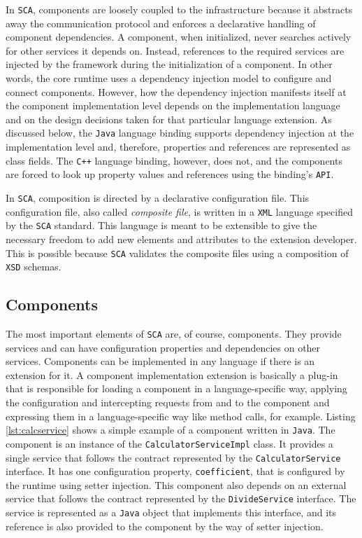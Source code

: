 In \texttt{SCA}, components are loosely coupled to the infrastructure because it abstracts away the communication protocol
and enforces a declarative handling of component dependencies. A component, when initialized, never searches
actively for other services it depends on. Instead, references to the required services are injected by the framework
during the initialization of a component. In other words, the core runtime uses a dependency injection model to
configure and connect components. However, how the dependency injection manifests itself at the component implementation
level depends on the implementation language and on the design decisions taken for that particular language extension.
As discussed below, the \texttt{Java} language binding supports dependency injection at the implementation level and, therefore,
properties and references are represented as class fields. The \texttt{C++} language binding, however, does not, and the components
are forced to look up property values and references using the binding's \texttt{API}.

In \texttt{SCA}, composition is directed by a declarative configuration file. This configuration file, also called \emph{composite file},
is written in a \texttt{XML} language specified by the \texttt{SCA} standard. This language is meant to be extensible to give the necessary
freedom to add new elements and attributes to the extension developer. This is possible because \texttt{SCA} validates the
composite files using a composition of \texttt{XSD} schemas.

\subsection{Components}

The most important elements of \texttt{SCA} are, of course, components. They provide services and can have configuration properties
and dependencies on other services. Components can be implemented in any language if there is an extension for it. A component
implementation extension is basically a plug-in that is responsible for loading a component in a language-specific way, applying
the configuration and intercepting requests from and to the component and expressing them in a language-specific way like method
calls, for example. Listing \ref{lst:calcservice} shows a simple example of a component written in \texttt{Java}. The component is an instance
of the \texttt{CalculatorServiceImpl} class. It provides a single service that follows the contract represented by the \texttt{CalculatorService}
interface. It has one configuration property, \texttt{coefficient}, that is configured by the runtime using setter injection.
This component also depends on an external service that follows the contract represented by the \texttt{DivideService} interface.
The service is represented as a \texttt{Java} object that implements this interface, and its reference is also provided to the component
by the way of setter injection.

